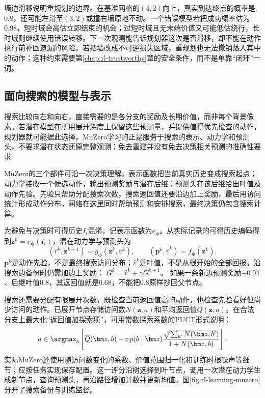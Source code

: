 墙边滑移说明重规划的边界。在基准网格的$(4,2)$向上，真实到达终点的概率是$0.8$，还可能左滑至$(3,2)$或撞右墙原地不动。一个错误模型若把成功概率估为$0.98$，短时域会高估立即结束的机会；过短时域且无末端价值又可能低估绕行，长时域则继续使用错误转移。下一次观测能告诉规划器这次是否滑移，却不能在动作执行前补回遗漏的风险。若把墙改成不可逆损失区域，重规划也无法撤销落入其中的动作；这种约束需要第\ref{chap:rl-trustworthy}章的安全条件，而不是单靠“闭环”一词。

\subsection{面向搜索的模型与表示}
\label{sec:rl-learning-muzero}

搜索比较向左和向右，直接需要的是各分支的奖励及长期价值，而非每个背景像素。若潜在模型在所用展开深度上保留这些预测量，并提供值得优先检查的动作，规划器就可能据此选择。MuZero学习的正是服务于搜索的表示、动力学和预测头，不要求潜在状态还原完整观测；免去重建并没有免去决策相关预测的准确性要求

MuZero的三个部件可沿一次决策理解。表示函数把当前真实历史变成搜索起点；动力学接收一个候选动作，输出预测奖励与潜在后继；预测头在该后继给出叶值及动作先验。先验只帮助分配搜索次数，搜索返回值还要沿边加上奖励，最后用访问统计形成动作分布。网络在这里同时帮助预测和安排搜索，最终决策仍包含搜索计算。

为避免与决策时可得历史$I_t$混淆，记表示函数为$e_{\bm\phi}$。从实际记录的可得历史编码得到$\bm z^0=e_{\bm\phi}(I_t)$，潜在动力学与预测头为
\begin{equation}
  (\widehat r^k,\bm z^{k+1})=g_{\bm\phi}(\bm z^k,a^k),
  \qquad
  (\bm p^k,\widehat v^k)=f_{\bm\phi}(\bm z^k).
  \label{eq:rl-learning-muzero-model}
\end{equation}
$\bm p^k$是动作先验，不是最终搜索访问分布；$\widehat v^k$是叶值，不是从根开始的全部回报。沿搜索边备份时仍需加边上奖励：
$G^k=\widehat r^k+\gamma G^{k+1}$。
如果一条新边预测奖励$-0.04$、后继叶值$0.8$，其返回值就是$0.68$，不能把$0.8$原样抄回父节点。

搜索还需要分配有限展开次数，既检查当前返回值高的动作，也检查先验看好但尚少访问的动作。已展开节点存储访问数$N(\bm z,a)$和平均返回值$\overline Q(\bm z,a)$。在合法分支上最大化“返回值加探索项”，可用常数探索系数的PUCT形式说明：
\[
  a\in\argmax_b\left[
    \overline Q(\bm z,b)
    +c\,p(b\mid\bm z)
      \frac{\sqrt{\sum_{b'}N(\bm z,b')}}{1+N(\bm z,b)}
  \right].
\]
实际MuZero还使用随访问数变化的系数、价值范围归一化和训练时根噪声等细节；应按任务实现保存配置。这一评分沿树选择到叶节点，调用一次潜在动力学生成新节点，查询预测头，再沿路径增加计数并更新均值。图\ref{fig:rl-learning-muzero}分开了搜索备份与训练监督。

